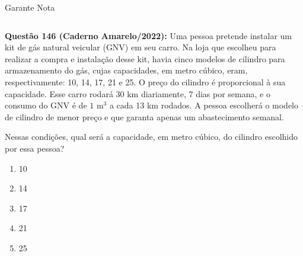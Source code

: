 \documentclass[aspectratio=169, t, 8pt]{beamer}
\begin{document}
    \begin{frame}{Garante Nota}
        \begin{columns}[totalwidth=.9\textwidth]
            \begin{column}{\textwidth}
                 \textcolor{black!65}{\bf Questão 146 (Caderno Amarelo/2022):} Uma pessoa pretende instalar um kit de gás natural veicular (GNV) em seu carro. Na loja que escolheu para realizar a compra e instalação desse kit, havia cinco modelos de cilindro para armazenamento do gás, cujas capacidades, em metro cúbico, eram, respectivamente: 10, 14, 17, 21 e 25. O preço do cilindro é proporcional à sua capacidade. Esse carro rodará 30 km diariamente, 7 dias por semana, e o consumo do GNV é de $1\text{ m}^3$ a cada 13 km rodados. A pessoa escolherá o modelo de cilindro de menor preço e que garanta apenas um abastecimento semanal.

                 Nessas condições, qual será a capacidade, em metro cúbico, do cilindro escolhido por essa pessoa?
                
                \begin{enumerate}[label=\alph*.), font=\bfseries]
                    \item 10
                    \item 14
                    \item 17
                    \item 21
                    \item 25
                \end{enumerate}
            \end{column}
        \end{columns}
    \end{frame}
\end{document}
